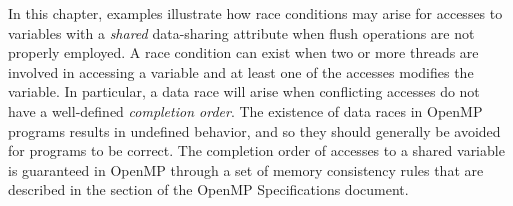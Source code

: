 In this chapter, examples illustrate how race conditions may arise for accesses
to variables with a \emph{shared} data-sharing attribute when flush operations
are not properly employed.  A race condition can exist when two or more threads
are involved in accessing a variable and at least one of the accesses modifies
the variable.  In particular, a data race will arise when conflicting accesses
do not have a well-defined \emph{completion order}.  The existence of data
races in OpenMP programs results in undefined behavior, and so they should
generally be avoided for programs to be correct.  The completion order of
accesses to a shared variable is guaranteed in OpenMP through a set of memory
consistency rules that are described in the 
section of the OpenMP Specifications document.




